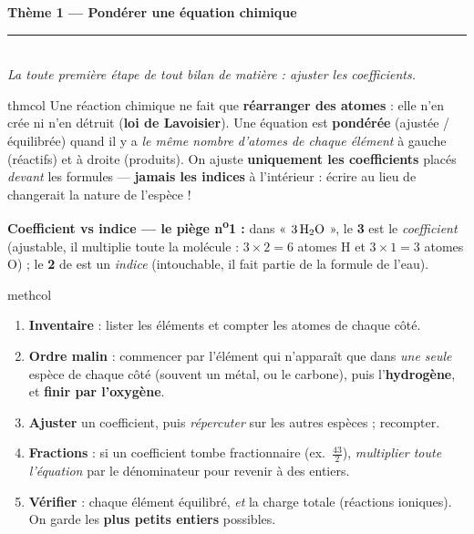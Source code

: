 \documentclass[11pt,a4paper]{article}
\begin{document}
\begin{center}
{\LARGE\bfseries\color{primarydark}Thème 1 — Pondérer une équation chimique}\\[1pt]
{\color{primary}\rule{0.5\linewidth}{1.2pt}}\\[2pt]
{\itshape La toute première étape de tout bilan de matière : ajuster les coefficients.}
\end{center}
\vspace{-3pt}

\begin{tutobox}{thmcol}
Une réaction chimique ne fait que \textbf{réarranger des atomes} : elle n'en crée ni n'en détruit
(\textbf{loi de Lavoisier}). Une équation est \textbf{pondérée} (ajustée / équilibrée) quand il y a
\emph{le même nombre d'atomes de chaque élément} à gauche (réactifs) et à droite (produits). On
ajuste \textbf{uniquement les coefficients} placés \emph{devant} les formules — \textbf{jamais les
indices} à l'intérieur : écrire  au lieu de  changerait la nature de l'espèce !
\end{tutobox}

\textbf{Coefficient vs indice — le piège n\textsuperscript{o}1 :}
dans « $3\,\ce{H2O}$ », le \textbf{3} est le \emph{coefficient} (ajustable, il multiplie toute la
molécule : $3\times2=6$ atomes H et $3\times1=3$ atomes O) ; le \textbf{2} de  est un
\emph{indice} (intouchable, il fait partie de la formule de l'eau).

\begin{tutobox}{methcol}
\begin{enumerate}[leftmargin=1.6em,topsep=1pt,itemsep=1.5pt]
  \item \textbf{Inventaire} : lister les éléments et compter les atomes de chaque côté.
  \item \textbf{Ordre malin} : commencer par l'élément qui n'apparaît que dans \emph{une seule}
        espèce de chaque côté (souvent un métal, ou le carbone), puis l'\textbf{hydrogène},
        et \textbf{finir par l'oxygène}.
  \item \textbf{Ajuster} un coefficient, puis \emph{répercuter} sur les autres espèces ; recompter.
  \item \textbf{Fractions} : si un coefficient tombe fractionnaire (ex.\ $\tfrac{43}{2}$),
        \emph{multiplier toute l'équation} par le dénominateur pour revenir à des entiers.
  \item \textbf{Vérifier} : chaque élément équilibré, \emph{et} la charge totale (réactions ioniques).
        On garde les \textbf{plus petits entiers} possibles.
\end{enumerate}
\end{tutobox}
\end{document}
